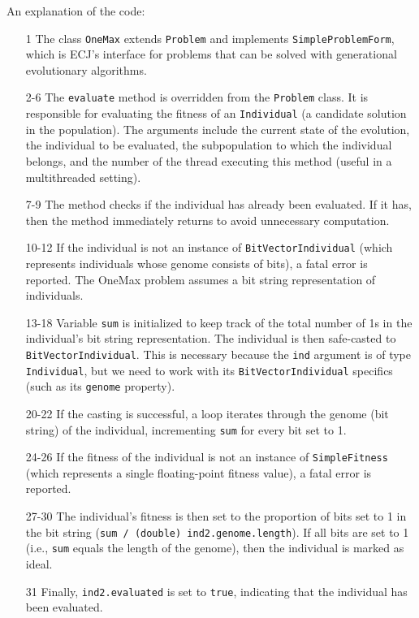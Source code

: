   An explanation of the code:

  \begin{enumerate}
    \item[1] The class \texttt{OneMax} extends \texttt{Problem} and implements \texttt{SimpleProblemForm}, which is ECJ's interface for problems that can be solved with generational evolutionary algorithms.
    
    \item[2-6] The \texttt{evaluate} method is overridden from the \texttt{Problem} class.
    It is responsible for evaluating the fitness of an \texttt{Individual} (a candidate solution in the population).
    The arguments include the current state of the evolution, the individual to be evaluated, the subpopulation to which the individual belongs, and the number of the thread executing this method (useful in a multithreaded setting).
    
    \item[7-9] The method checks if the individual has already been evaluated.
    If it has, then the method immediately returns to avoid unnecessary computation.
    
    \item[10-12] If the individual is not an instance of \texttt{BitVectorIndividual} (which represents individuals whose genome consists of bits), a fatal error is reported.
    The OneMax problem assumes a bit string representation of individuals.
    
    \item[13-18] Variable \texttt{sum} is initialized to keep track of the total number of 1s in the individual's bit string representation.
    The individual is then safe-casted to \texttt{BitVectorIndividual}.
    This is necessary because the \texttt{ind} argument is of type \texttt{Individual}, but we need to work with its \texttt{BitVectorIndividual} specifics (such as its \texttt{genome} property).
    
    \item[20-22] If the casting is successful, a loop iterates through the genome (bit string) of the individual, incrementing \texttt{sum} for every bit set to 1.
    
    \item[24-26] If the fitness of the individual is not an instance of \texttt{SimpleFitness} (which represents a single floating-point fitness value), a fatal error is reported.
    
    \item[27-30] The individual's fitness is then set to the proportion of bits set to 1 in the bit string (\texttt{sum / (double) ind2.genome.length}).
    If all bits are set to 1 (i.e., \texttt{sum} equals the length of the genome), then the individual is marked as ideal.
    
    \item[31] Finally, \texttt{ind2.evaluated} is set to \texttt{true}, indicating that the individual has been evaluated.
  \end{enumerate}

